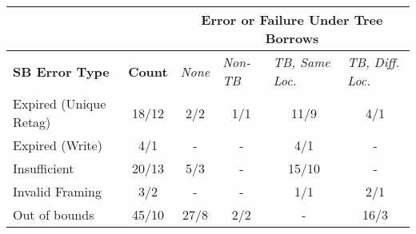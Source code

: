\begin{tabular}{lc|cccc|}
\cline{3-6}
                                             & \multicolumn{1}{l|}{}               & \multicolumn{4}{c|}{\textbf{Error or Failure Under Tree Borrows}}                                                                                                      \\ \hline
\multicolumn{1}{|l|}{\textbf{SB Error Type}} & \multicolumn{1}{l|}{\textbf{Count}} & \multicolumn{1}{l|}{\textit{None}} & \multicolumn{1}{l|}{\textit{Non-TB}} & \multicolumn{1}{l|}{\textit{TB, Same Loc.}} & \multicolumn{1}{l|}{\textit{TB, Diff. Loc.}} \\ \hline\hline
\multicolumn{1}{|l|}{Expired (Unique Retag)} & 18/12                               & \multicolumn{1}{c|}{2/2}           & \multicolumn{1}{c|}{1/1}             & \multicolumn{1}{c|}{11/9}                   & 4/1                                          \\ \hline
\multicolumn{1}{|l|}{Expired (Write)}        & 4/1                                 & \multicolumn{1}{c|}{-}             & \multicolumn{1}{c|}{-}               & \multicolumn{1}{c|}{4/1}                    & -                                            \\ \hline
\multicolumn{1}{|l|}{Insufficient}           & 20/13                               & \multicolumn{1}{c|}{5/3}           & \multicolumn{1}{c|}{-}               & \multicolumn{1}{c|}{15/10}                  & -                                            \\ \hline
\multicolumn{1}{|l|}{Invalid Framing}        & 3/2                                 & \multicolumn{1}{c|}{-}             & \multicolumn{1}{c|}{-}               & \multicolumn{1}{c|}{1/1}                    & 2/1                                          \\ \hline
\multicolumn{1}{|l|}{Out of bounds}          & 45/10                               & \multicolumn{1}{c|}{27/8}          & \multicolumn{1}{c|}{2/2}             & \multicolumn{1}{c|}{-}                      & 16/3                                         \\ \hline
\end{tabular}